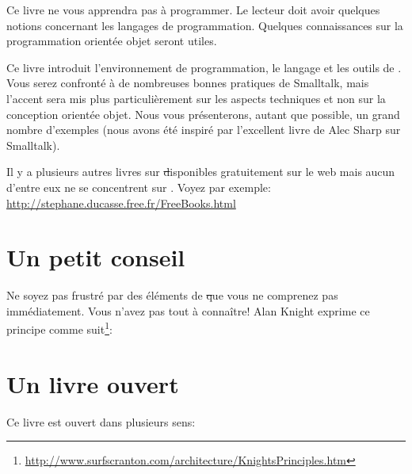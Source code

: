 \documentclass[a4paper,10pt,twoside]{book}
\begin{document}
Ce livre ne vous apprendra pas à programmer. Le lecteur doit avoir quelques 
notions concernant les langages de programmation. Quelques connaissances 
sur la programmation orientée objet seront utiles.

Ce livre introduit l'environnement de programmation, le langage et
les outils de \pharo. Vous serez confronté à de nombreuses bonnes
pratiques de Smalltalk, mais l'accent sera mis plus particulièrement
sur les aspects techniques et non sur la conception orientée
objet. Nous vous présenterons, autant que possible, un grand nombre d'exemples (nous avons été inspiré par l'excellent livre de Alec
Sharp sur Smalltalk\cite{Shar97a}).

Il y a plusieurs autres livres sur \st disponibles gratuitement 
sur le web mais aucun d'entre eux ne se concentrent sur \pharo. 
Voyez par exemple: \url{http://stephane.ducasse.free.fr/FreeBooks.html}

\ifluluelse{}{\newpage} %
\section*{Un petit conseil}


Ne soyez pas frustré par des éléments de \st que vous ne comprenez pas immédiatement.
Vous n'avez pas tout à connaître!
Alan Knight exprime ce principe comme suit\footnote{\url{http://www.surfscranton.com/architecture/KnightsPrinciples.htm}}:
\important{{\bf Ne vous en préoccupez pas!}%
\footnote{Dans sa version originale: ``Try not to care''.}
Les développeurs \st débutants ont souvent beaucoup de
difficultés car ils pensent qu'il est nécessaire de connaître
tous les détails d'une chose avant de l'utiliser. Cela signifie
qu'il leur faut un moment avant de maîtriser un 
simple: \ct{Transcript show: 'Hello World'}. 
Une des grandes avancées de la programmation par objets est de 
pouvoir répondre à la question ``Comment ceci marche?'' avec  ``Je ne m'en préoccupe pas''.}

\section*{Un livre ouvert}

Ce livre est ouvert dans plusieurs sens:
\end{document}
